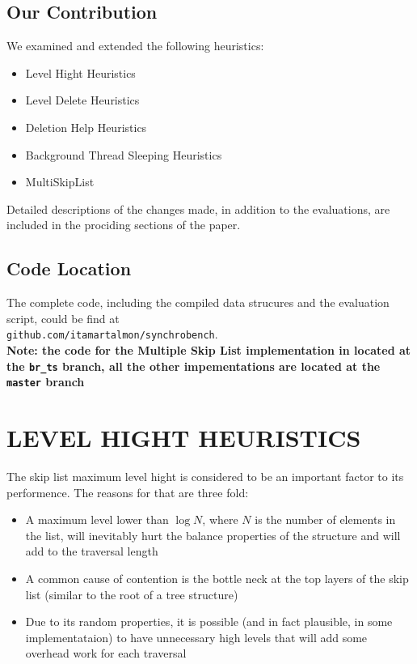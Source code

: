 \documentclass{article}
\begin{document}
\subsection{Our Contribution}
\label{ssec:oc}

We examined and extended the following heuristics:

\begin{itemize}
	\item Level Hight Heuristics
	\item Level Delete Heuristics 
	\item Deletion Help Heuristics
	\item Background Thread Sleeping Heuristics
	\item MultiSkipList
\end{itemize}

\hfill \break
Detailed descriptions of the changes made, in addition to the evaluations, are included in the prociding sections of the paper.

\subsection{Code Location}
\label{ssec:cl}
The complete code, including the compiled data strucures and the evaluation script, could be find at \\\texttt{github.com/itamartalmon/synchrobench}.\\\textbf{Note: the code for the Multiple Skip List implementation in located at the \texttt{br\_ts} branch, all the other impementations are located at the \texttt{master} branch}

\section{LEVEL HIGHT HEURISTICS}
\label{sec:lhh}

The skip list maximum level hight is considered to be an important factor to its performence. The reasons for that are three fold:

\begin{itemize}
	\item  A maximum level lower than $\log{N}$, where $N$ is the number of elements in the list, will inevitably hurt the balance properties of the structure and will add to the traversal length
	\item A common cause of contention is the bottle neck at the top layers of the skip list (similar to the root of a tree structure)
	\item Due to its random properties, it is possible (and in fact plausible, in some implementataion) to have unnecessary high levels that will add some overhead work for each traversal
\end{itemize}
\end{document}
